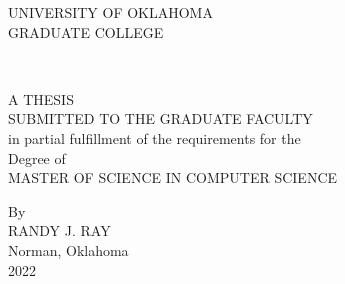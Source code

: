 \thispagestyle{empty}
\begin{center}
UNIVERSITY OF OKLAHOMA \\
\medskip
GRADUATE COLLEGE \\

\vspace{2.0in}

\MakeUppercase{\mytitle{}} \\

\vspace{2.0in}

A THESIS \\
\medskip
SUBMITTED TO THE GRADUATE FACULTY \\
\medskip
in partial fulfillment of the requirements for the \\
\medskip
Degree of \\
\medskip
MASTER OF SCIENCE IN COMPUTER SCIENCE \\

\mbox{}
\vfill

By \\
\medskip
RANDY J. RAY \\
Norman, Oklahoma \\
2022 \\
\end{center}
\pagebreak
